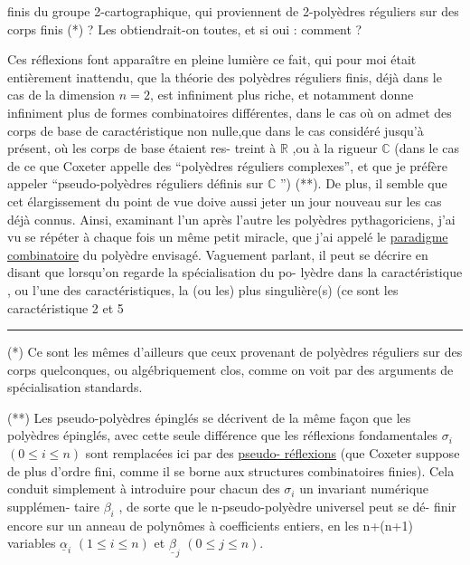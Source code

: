 
finis du groupe 2-cartographique, qui proviennent de 2-polyèdres
réguliers sur des corps finis (*) ? Les obtiendrait-on toutes,
et si oui : comment ?

Ces réflexions font apparaître en pleine lumière ce fait,
qui pour moi était entièrement inattendu, que la théorie des
polyèdres réguliers finis, déjà dans le cas de la dimension
$n = 2$, est infiniment plus riche, et notamment donne infiniment
plus de formes combinatoires différentes, dans le cas où on admet
des corps de base de caractéristique non nulle,\quad que dans le
cas considéré jusqu'à présent, où les corps de base étaient res-%
treint à $\mathbb{R}$ ,ou à la rigueur $\mathbb{C}$ (dans le cas de ce que Coxeter
appelle des ``polyèdres réguliers complexes'', et que je préfère
appeler ``pseudo-polyèdres réguliers définis sur $\mathbb{C}$ '') (**). De plus,
il semble que cet élargissement du point de vue doive aussi jeter
un jour nouveau sur les cas déjà connus. Ainsi, examinant l'un
après l'autre les polyèdres pythagoriciens, j'ai vu se répéter
à chaque fois un même petit miracle, que j'ai appelé le \uline{paradigme
combinatoire} du polyèdre envisagé. Vaguement parlant, il peut se
décrire en disant que lorsqu'on regarde la spécialisation du po-%
lyèdre dans la caractéristique , ou l'une des caractéristiques, la
(ou les) plus singulière(s) (ce sont les caractéristique 2 et 5

\rule{5cm}{0.4pt}

(*) Ce sont les mêmes d'ailleurs que ceux provenant de polyèdres
réguliers sur des corps quelconques, ou algébriquement clos, comme
on voit par des arguments de spécialisation standards.

(**) Les pseudo-polyèdres épinglés se décrivent de la même façon que
les polyèdres épinglés, avec cette seule différence que les réflexions
fondamentales $\sigma_i$ $(0 \leq i \leq n)$ sont remplacées ici par des \uline{pseudo-%
réflexions} (que Coxeter suppose de plus d'ordre fini, comme il se
borne aux structures combinatoires finies). Cela conduit simplement
à introduire pour chacun des $\sigma_i$ un invariant numérique supplémen-%
taire $\beta_i$ , de sorte que le n-pseudo-polyèdre universel peut se dé-%
finir encore sur un anneau de polynômes à coefficients entiers, en
les n+(n+1) variables $\underline{\alpha}_i$ $(1 \leq i \leq n)$ et $\underline{\beta}_j$ $(0 \leq j \leq n)$.

